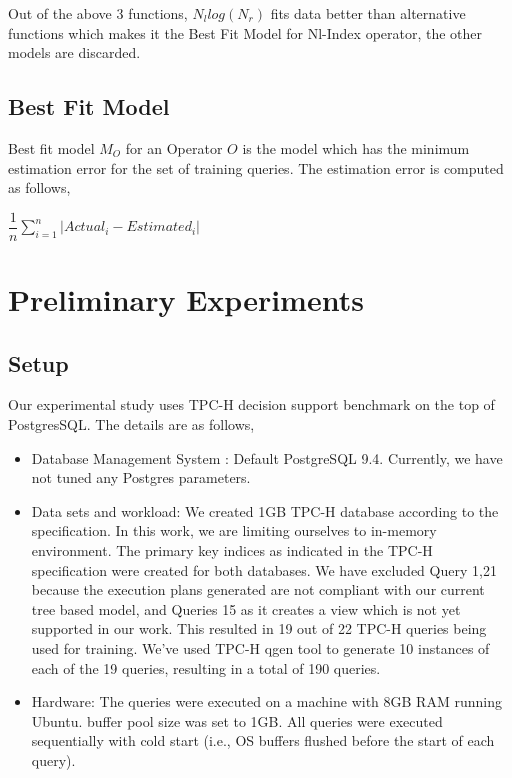 \documentclass{article}
\begin{document}
\begin{multicols}{2}
	Out of the above 3 functions, $N_{l} log(N_{r})$ fits data better than alternative functions which makes it the Best Fit Model for Nl-Index operator, the other models are discarded. 	
	\subsection{Best Fit Model}	
	Best fit model $M_{O}$ for an Operator $O$ is the model which has the minimum estimation error 
	for the set of training queries. The estimation error is computed as follows,
	
	\begin{center}
	$\dfrac{1}{n} \sum\limits_{i=1}^n \left| Actual_{i} - Estimated_{i} \right|$
	\end{center}
	
	\section{Preliminary Experiments}
	\subsection{Setup}
	Our experimental study uses TPC-H decision support benchmark \cite{TPCH} on the top of 
	PostgresSQL. The details are as follows, 

	\begin{itemize}
	\item Database Management System : Default PostgreSQL 9.4. Currently, we have not tuned 
	any Postgres parameters. %
	\item Data sets and workload: We created 1GB TPC-H database
	according to the specification. In this work, we are limiting ourselves to in-memory 
	environment. The primary key indices as indicated
	in the TPC-H specification were created for both databases. We have excluded Query 1,21  
	because the execution plans generated are not compliant with our current tree based 
	model, and Queries 15 as it creates a view which is 
	not yet	supported in our work. This resulted in 19 out of 22 TPC-H queries being used 
	for training. We've used TPC-H qgen tool to generate 10 instances of each of the 19 
	queries, resulting in a total of 190 queries.
	
	\item Hardware: The queries were executed on a machine
	with 8GB RAM running Ubuntu. buffer pool size was set to 1GB. All queries were executed 
	sequentially with cold start (i.e., OS buffers flushed before the start of each query).
	

\end{itemize}
\end{multicols}
\end{document}

